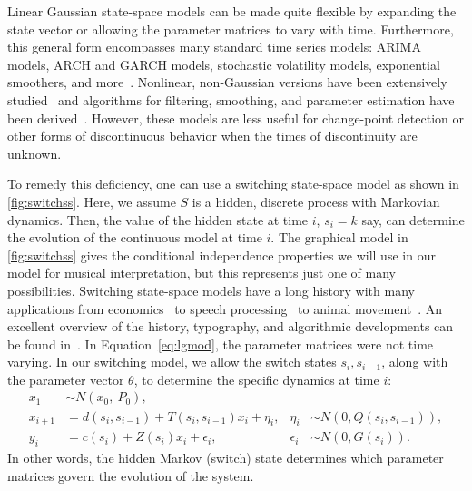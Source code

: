 \documentclass[aoas]{imsart}
\begin{document}
Linear Gaussian state-space models can be made quite flexible
by expanding the state vector or allowing the parameter matrices to
vary with time. Furthermore, this general form encompasses many
standard time series models: ARIMA models, ARCH and GARCH models,
stochastic volatility models, exponential smoothers, and
more~\citep[see][for many other
examples]{DurbinKoopman2001}. Nonlinear, non-Gaussian versions have
been extensively
studied~\citep{DurbinKoopman1997,Fuh2006,Kitagawa1987,Kitagawa1996}
and algorithms for filtering, smoothing, and parameter estimation have
been derived~\citep[e.g.,][]{KoyamaPerez-Bolde2010,AndrieuDoucet2010}. 
However, these models are less useful
for change-point detection or other forms of discontinuous behavior
when the times of discontinuity are unknown. 

To remedy this deficiency, one can use a switching state-space
model as shown in \autoref{fig:switchss}. Here, we assume $S$ is a
hidden, discrete process with Markovian dynamics. Then, the value of
the hidden state at time $i$, $s_i=k$ say, can determine the evolution of
the continuous model at time $i$. The graphical model in
\autoref{fig:switchss} gives the conditional independence properties
we will use in our model for musical interpretation, but this
represents just one of many possibilities. Switching state-space models have a long
history with many applications from
economics~\citep{KimNelson1998,Kim1994,Hamilton2011} to speech
processing~\citep{FoxSudderth2011} to animal
movement~\citep{PattersonThomas2008,BlockJonsen2011}. An excellent
overview of the history, typography, and algorithmic developments can
be found in~\citep{GhahramaniHinton2000}. In Equation~\eqref{eq:lgmod}, the
parameter matrices were not time varying. In our switching model, we
allow the switch states $s_i, s_{i-1}$, along with the parameter
vector $\theta$, to determine the specific dynamics at time $i$:
\begin{equation}
  \begin{aligned}
    x_1 &\sim N(x_0,\ P_0),\\
    x_{i+1}&= d(s_i,s_{i-1})+T(s_i,s_{i-1}) x_i + \eta_i, 
    & \eta_i &\sim N(0,Q(s_i,s_{i-1})),\\
    y_i&= c(s_i) + Z(s_i) x_i + \epsilon_i, & \epsilon_i &\sim N(0, G(s_i)).
  \end{aligned}
\end{equation}
In other words, the hidden Markov (switch) state determines which parameter
matrices govern the evolution of the system. 
\end{document}

